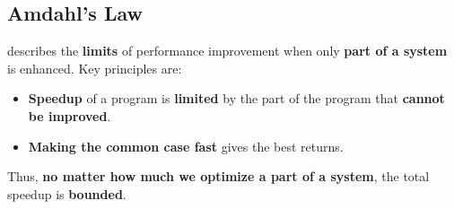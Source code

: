\subsection{Amdahl's Law}

 describes the \textbf{limits} of performance improvement when only \textbf{part of a system} is enhanced. Key principles are:
\begin{itemize}
    \item \textbf{Speedup} of a program is \textbf{limited} by the part of the program that \textbf{cannot be improved}.
    \item \textbf{Making the common case fast} gives the best returns.
\end{itemize}
Thus, \textbf{no matter how much we optimize a part of a system}, the total speedup is \textbf{bounded}.

